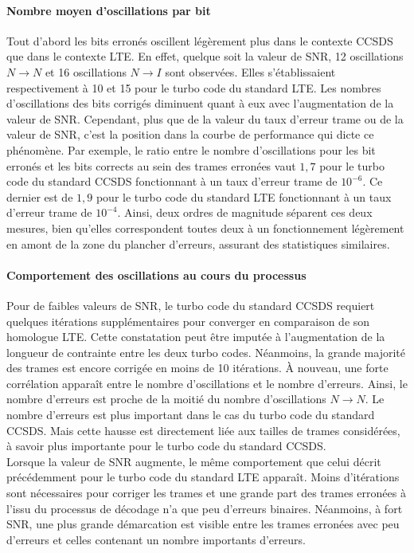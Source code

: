 \paragraph*{Nombre moyen d'oscillations par bit} 
Tout d'abord les bits erronés oscillent légèrement plus dans le contexte CCSDS que dans le contexte LTE. En effet, 
quelque soit la valeur de SNR, 12 oscillations $N\rightarrow N$ et 16 oscillations $N\rightarrow I$ sont observées. Elles 
s'établissaient respectivement à 10 et 15 pour le turbo code du standard LTE. Les nombres d'oscillations des bits corrigés diminuent quant à eux
avec l’augmentation de la valeur de SNR. Cependant, plus que de la valeur du taux d'erreur trame ou de la valeur de SNR,
c'est la position dans la courbe de performance qui dicte ce phénomène. Par exemple, le ratio entre le nombre 
d'oscillations pour les bit erronés et les bits corrects au sein des trames erronées vaut $1,7$ pour le turbo code du 
standard CCSDS fonctionnant à un taux d'erreur trame de $10^{-6}$. Ce dernier est de $1,9$ pour le turbo code du 
standard LTE fonctionnant à un taux d'erreur trame de $10^{-4}$. Ainsi, deux ordres de magnitude séparent ces deux mesures,
bien qu'elles correspondent toutes deux à un fonctionnement légèrement en amont de la zone du plancher d'erreurs, assurant des statistiques similaires.
\paragraph*{Comportement des oscillations au cours du processus}
Pour de faibles valeurs de SNR, le turbo code du standard CCSDS requiert quelques itérations supplémentaires pour converger en comparaison de son homologue
LTE. Cette constatation peut être imputée à l'augmentation de la longueur de contrainte entre les deux turbo codes. Néanmoins,
la grande majorité des trames est encore corrigée en moins de 10 itérations. À nouveau, une forte corrélation apparaît 
entre le nombre d'oscillations et le nombre d'erreurs. Ainsi, le nombre d'erreurs est proche de la moitié du nombre d'oscillations
$N \rightarrow N$. Le nombre d'erreurs est plus important dans le cas du turbo code du standard CCSDS. Mais cette hausse est
directement liée aux tailles de trames considérées, à savoir plus importante pour le turbo code du standard CCSDS.\\
Lorsque la valeur de SNR augmente, le même comportement que celui décrit précédemment pour le turbo code du standard LTE apparaît. 
Moins d'itérations sont nécessaires pour corriger les trames et une grande part des trames erronées à l'issu du processus de décodage 
n'a que peu d'erreurs binaires. Néanmoins, à fort SNR, une plus grande démarcation est visible entre les trames erronées 
avec peu d'erreurs et celles contenant un nombre importants d'erreurs.
